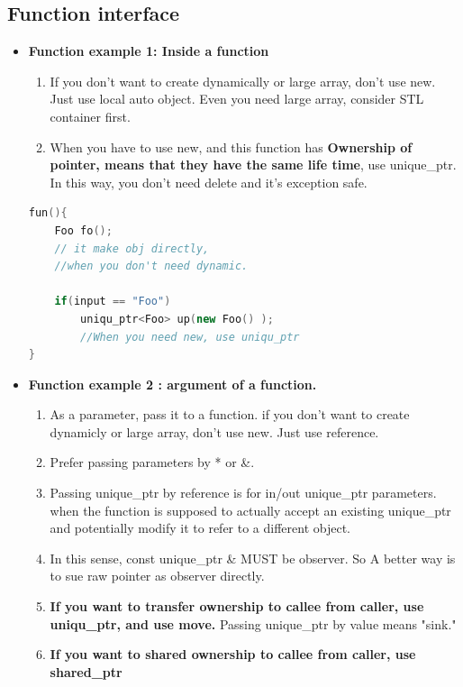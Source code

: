 \documentclass[a4paper,12pt,twoside]{book}
\begin{document}
\subsection{Function interface}

\begin{itemize}

\item \textbf{Function example 1: Inside a function}
\begin{enumerate}
\item If you don't want to create dynamically or large array, don't use new. Just use local auto object. Even you need large array, consider STL container first.
\item When you have to use new, and this function has \textbf{Ownership of pointer, means that they have the same life time},  use unique\_ptr. In this way, you don't need delete and it's exception safe.
\end{enumerate}
\begin{lstlisting}[frame=single, language=c++]
fun(){
	Foo fo();
	// it make obj directly,
	//when you don't need dynamic.

	if(input == "Foo")
		uniqu_ptr<Foo> up(new Foo() );
		//When you need new, use uniqu_ptr
}
\end{lstlisting}


\item \textbf{Function example 2 : argument of a function.}
\begin{enumerate}
\item As a parameter, pass it to a function. if you don't want to create dynamicly or large array, don't use new. Just use reference.

\item Prefer passing parameters by * or \&.

\item Passing unique\_ptr by reference is for in/out unique\_ptr parameters. when the function is supposed to actually accept an existing unique\_ptr and potentially modify it to refer to a different object. 

\item In this sense, const unique\_ptr \& MUST be observer. So A better way is to sue raw pointer as observer directly.

\item \textbf{If you want to transfer ownership to callee from caller, use uniqu\_ptr, and use move.} Passing unique\_ptr by value means "sink."

\item \textbf{If you want to shared ownership to callee from caller, use shared\_ptr}


\end{enumerate}
\end{itemize}
\end{document}
